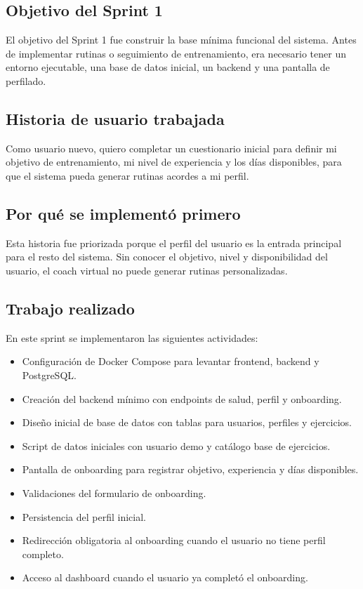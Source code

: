 \documentclass[12pt,a4paper]{article}
\begin{document}
\subsection{Objetivo del Sprint 1}

El objetivo del Sprint 1 fue construir la base mínima funcional del sistema. Antes de implementar rutinas o seguimiento de entrenamiento, era necesario tener un entorno ejecutable, una base de datos inicial, un backend y una pantalla de perfilado.

\subsection{Historia de usuario trabajada}

\begin{tcolorbox}[title=\textbf{US-01: Onboarding y Perfilado}]
Como usuario nuevo, quiero completar un cuestionario inicial para definir mi objetivo de entrenamiento, mi nivel de experiencia y los días disponibles, para que el sistema pueda generar rutinas acordes a mi perfil.
\end{tcolorbox}

\subsection{Por qué se implementó primero}

Esta historia fue priorizada porque el perfil del usuario es la entrada principal para el resto del sistema. Sin conocer el objetivo, nivel y disponibilidad del usuario, el coach virtual no puede generar rutinas personalizadas.

\subsection{Trabajo realizado}

En este sprint se implementaron las siguientes actividades:

\begin{itemize}
    \item Configuración de Docker Compose para levantar frontend, backend y PostgreSQL.
    \item Creación del backend mínimo con endpoints de salud, perfil y onboarding.
    \item Diseño inicial de base de datos con tablas para usuarios, perfiles y ejercicios.
    \item Script de datos iniciales con usuario demo y catálogo base de ejercicios.
    \item Pantalla de onboarding para registrar objetivo, experiencia y días disponibles.
    \item Validaciones del formulario de onboarding.
    \item Persistencia del perfil inicial.
    \item Redirección obligatoria al onboarding cuando el usuario no tiene perfil completo.
    \item Acceso al dashboard cuando el usuario ya completó el onboarding.
\end{itemize}
\end{document}
